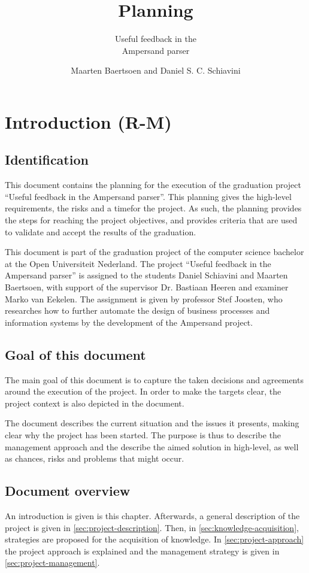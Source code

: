 \documentclass[a4paper,12pt,abstracton,titlepage]{scrartcl}
\author{Maarten Baertsoen and Daniel S. C. Schiavini}
\affil{Open Universiteit Nederland, faculteit Informatica \\
	T61327 - Afstudeerproject bachelor informatica}
\title{Planning}
\subtitle{Useful feedback in the\\ Ampersand parser}
\begin{document}
\maketitle
\newpage

\tableofcontents
\listoffigures
\clearpage

\section{Introduction (R-M)}
\subsection{Identification}
This document contains the planning for the execution of the graduation project ``Useful feedback in the Ampersand parser''.
This planning gives the high-level requirements, the risks and a timefor the project.
As such, the planning provides the steps for reaching the project objectives, and provides criteria that are used to validate and accept the results of the graduation.

This document is part of the graduation project of the computer science bachelor at the Open Universiteit Nederland.
The project ``Useful feedback in the Ampersand parser'' is assigned to the students Daniel Schiavini and Maarten Baertsoen, with support of the supervisor Dr. Bastiaan Heeren and examiner Marko van Eekelen.
The assignment is given by professor Stef Joosten, who researches how to further automate the design of business processes and information systems by the development of the Ampersand project.

\subsection{Goal of this document}
The main goal of this document is to capture the taken decisions and agreements around the execution of the project.
In order to make the targets clear, the project context is also depicted in the document.

The document describes the current situation and the issues it presents, making clear why the project has been started.
The purpose is thus to describe the management approach and the describe the aimed solution in high-level, as well as chances, risks and problems that might occur.

\subsection{Document overview}
An introduction is given is this chapter.
Afterwards, a general description of the project is given in \autoref{sec:project-description}.
Then, in \autoref{sec:knowledge-acquisition}, strategies are proposed for the acquisition of knowledge.
In \autoref{sec:project-approach} the project approach is explained and the management strategy is given in \autoref{sec:project-management}.
\end{document}
